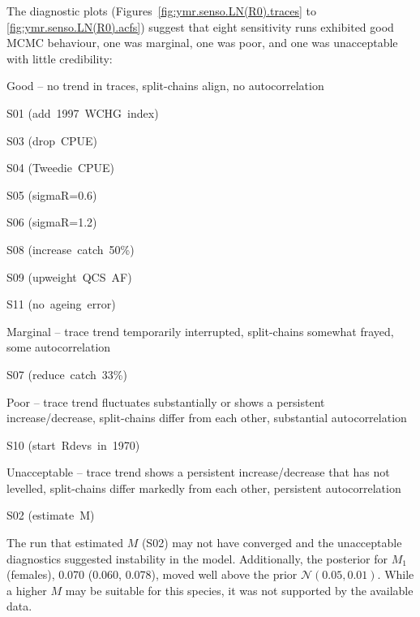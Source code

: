 \documentclass[11pt]{book}
\begin{document}
The diagnostic plots (Figures~\ref{fig:ymr.senso.LN(R0).traces} to \ref{fig:ymr.senso.LN(R0).acfs}) suggest that eight sensitivity runs exhibited good MCMC behaviour, one  was marginal, one was poor, and one was unacceptable with little credibility:
\vspace{-0.5\baselineskip}%
\begin{itemize_csas}
  \item Good -- no trend in traces, split-chains align, no autocorrelation
  \begin{itemize_csas}
    \item S01 (add~1997~WCHG~index)
    \item S03 (drop~CPUE)
    \item S04 (Tweedie~CPUE)
    \item S05 (sigmaR=0.6)
    \item S06 (sigmaR=1.2)
    \item S08 (increase~catch~50\%)
    \item S09 (upweight~QCS~AF)
    \item S11 (no~ageing~error)
  \end{itemize_csas}
  \item Marginal -- trace trend temporarily interrupted, split-chains somewhat frayed, some autocorrelation
  \begin{itemize_csas}
    \item S07 (reduce~catch~33\%)
  \end{itemize_csas}
  \item Poor -- trace trend fluctuates substantially or shows a persistent increase/decrease, split-chains differ from each other, substantial autocorrelation
  \begin{itemize_csas}
    \item S10 (start~Rdevs~in~1970)
  \end{itemize_csas}
  \item Unacceptable -- trace trend shows a persistent increase/decrease that has not levelled, split-chains differ markedly from each other, persistent autocorrelation
  \begin{itemize_csas}
    \item S02 (estimate~M)
  \end{itemize_csas}
 \end{itemize_csas}

The run that estimated $M$ (S02) may not have converged and the unacceptable diagnostics suggested instability in the model.
Additionally, the posterior for $M_1$ (females), 0.070 (0.060, 0.078), moved well above the prior $\mathcal{N}(0.05,0.01)$.
While a higher $M$ may be suitable for this species, it was not supported by the available data.
\end{document}
